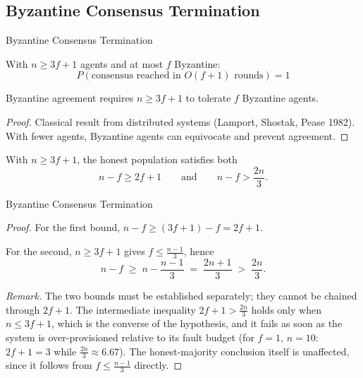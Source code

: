 \documentclass[
  ignorenonframetext,
]{beamer}
\begin{document}
\begin{frame}
\end{frame}

\subsection{Byzantine Consensus Termination}\label{sec:thm510-proof}

\begin{frame}[allowframebreaks]{Byzantine Consensus Termination}
\begin{theorem}
\label{thm:byzantine-restated}
With $n \geq 3f + 1$ agents and at most $f$ Byzantine:
\begin{equation}
\label{eq:byzantine-restated}
P(\text{consensus reached in } O(f+1) \text{ rounds}) = 1
\end{equation}
\end{theorem}

\begin{lemma}
\label{lem:byzantine-bound}
Byzantine agreement requires $n \geq 3f + 1$ to tolerate $f$ Byzantine agents.
\end{lemma}

\begin{proof}
Classical result from distributed systems (Lamport, Shostak, Pease 1982). With fewer agents, Byzantine agents can equivocate and prevent agreement.
\end{proof}

\begin{lemma}
\label{lem:honest-majority}
With $n \geq 3f + 1$, the honest population satisfies both
\begin{equation}
\label{eq:honest-majority}
n - f \geq 2f + 1
\qquad\text{and}\qquad
n - f > \frac{2n}{3}.
\end{equation}
\end{lemma}

\end{frame}

\begin{frame}[allowframebreaks]{Byzantine Consensus Termination}
\begin{proof}
For the first bound, $n - f \geq (3f + 1) - f = 2f + 1$.

For the second, $n \geq 3f + 1$ gives $f \leq \frac{n-1}{3}$, hence
\[
n - f \;\geq\; n - \frac{n-1}{3} \;=\; \frac{2n + 1}{3} \;>\; \frac{2n}{3}.
\]

\emph{Remark.} The two bounds must be established separately; they cannot be
chained through $2f + 1$. The intermediate inequality $2f + 1 > \frac{2n}{3}$
holds only when $n \leq 3f + 1$, which is the converse of the hypothesis, and it
fails as soon as the system is over-provisioned relative to its fault budget
(for $f = 1$, $n = 10$: $2f + 1 = 3$ while $\frac{2n}{3} \approx 6.67$). The
honest-majority conclusion itself is unaffected, since it follows from
$f \leq \frac{n-1}{3}$ directly.
\end{proof}

\end{frame}
\end{document}
